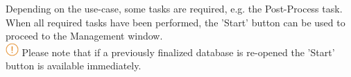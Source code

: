 Depending on the use-case, some tasks are required, e.g. the Post-Process task. When all required tasks have been performed, the 'Start' button can be used to proceed to the Management window. \\

\includegraphics[width=0.5cm]{../../data/icons/hint.png} Please note that if a previously finalized database is re-opened the 'Start' button is available immediately.






















